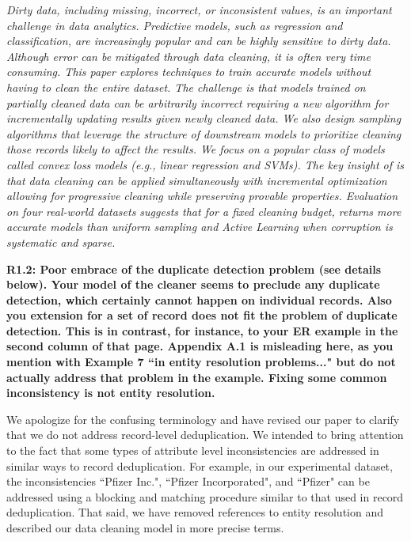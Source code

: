 \emph{Dirty data, including missing, incorrect, or inconsistent values, is an important challenge in data analytics.
Predictive models, such as regression and classification, are increasingly popular and can be highly sensitive to dirty data.
Although error can be mitigated through data cleaning, it is often very time consuming.
This paper explores techniques to train accurate models without having to clean the entire dataset.
The challenge is that models trained on partially cleaned data can be arbitrarily incorrect requiring a new algorithm for incrementally updating results given newly cleaned data.
We also design sampling algorithms that leverage the structure of downstream models to prioritize cleaning those records likely to affect the results.
We focus on a popular class of models called convex loss models (e.g., linear regression and SVMs).
The key insight of \sys is that data cleaning can be applied simultaneously with incremental optimization allowing for progressive cleaning while preserving provable properties.
Evaluation on four real-world datasets suggests that for a fixed cleaning budget, \sys returns more accurate models than uniform sampling and Active Learning when corruption is systematic and sparse.}

\vspace{0.5em}

\noindent\textbf{R1.2: Poor embrace of the duplicate detection problem (see details below). Your model of the cleaner seems to preclude any duplicate detection, which certainly cannot happen on individual records. Also you extension for a set of record does not fit the problem of duplicate detection. This is in contrast, for instance, to your ER example in the second column of that page. Appendix A.1 is misleading here, as you mention with Example 7 ``in entity resolution problems..." but do not actually address that problem in the example. Fixing some common inconsistency is not entity resolution.}

We apologize for the confusing terminology and have revised our paper to clarify that we do not address record-level deduplication.
We intended to bring attention to the fact that some types of attribute level inconsistencies are addressed in similar ways to record deduplication.
For example, in our experimental dataset, the inconsistencies ``Pfizer Inc.", ``Pfizer Incorporated", and ``Pfizer" can be addressed using a blocking and matching procedure similar to that used in record deduplication.
That said, we have removed references to entity resolution and described our data cleaning model in more precise terms.

